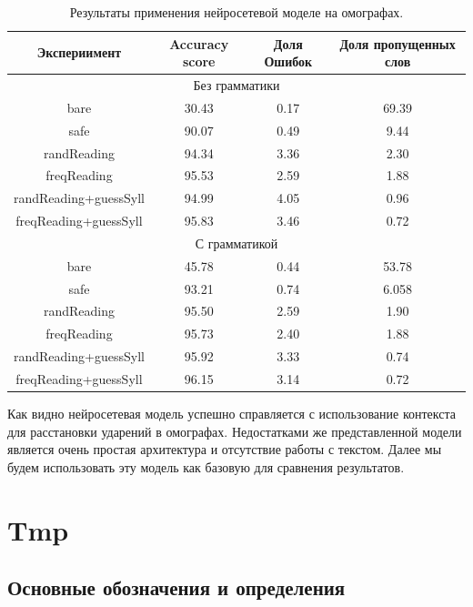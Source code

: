 \documentclass[14pt, a4paper, russian]{report}
\begin{document}
\begin{normalsize}
\begin{table}[H]
	\begin{small}
		\begin{center}
			\begin{tabular}{|c|c|c|c|}
				\hline
				Экспериимент & Accuracy score & Доля Ошибок & Доля пропущенных слов\\
				\hline
				\multicolumn{4}{|c|}{Без грамматики} \\			
				\hline
				bare & 30.43 & 0.17 & 69.39 \\
				\hline
				safe & 90.07 & 0.49 & 9.44 \\
				\hline
				randReading &94.34 &3.36 &2.30 \\
				\hline
				freqReading &95.53 &2.59& 1.88 \\
				\hline
				randReading+guessSyll &94.99 &4.05 &0.96 \\
				\hline
				freqReading+guessSyll & 95.83 &3.46 &0.72\\
				\hline
				\multicolumn{4}{|c|}{С грамматикой} \\			
				\hline
				bare &45.78 & 0.44 &53.78\\
				\hline
				safe &93.21& 0.74 &6.058 \\
				\hline
				randReading &95.50 &2.59 &1.90 \\
				\hline
				freqReading &95.73 &2.40 &1.88 \\
				\hline
				randReading+guessSyll &95.92 &3.33 &0.74 \\
				\hline
				freqReading+guessSyll &96.15 &3.14 &0.72 \\
				\hline
				
			\end{tabular}
		\end{center}
	\end{small}
	\caption{Результаты применения нейросетевой моделе на омографах.}
	\label{table:base_homo}
\end{table}

Как видно нейросетевая модель успешно справляется с использование контекста для расстановки ударений в омографах. Недостатками же представленной модели является очень простая архитектура и отсутствие работы с текстом. Далее мы будем использовать эту модель как базовую для сравнения результатов. 


\newpage
\chapter{Tmp}
\section{Основные обозначения и определения}


\end{normalsize}
\end{document}
